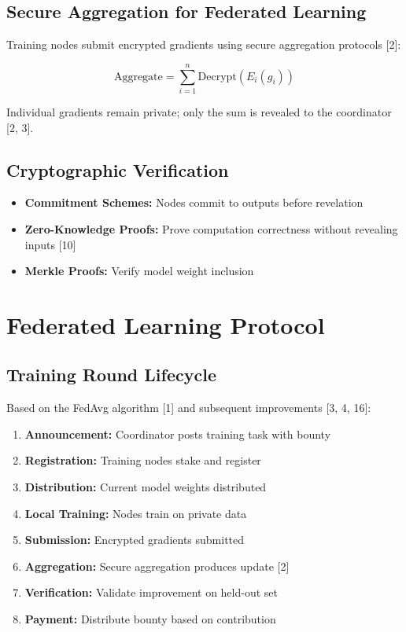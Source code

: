 \documentclass[11pt,a4paper]{article}
\begin{document}
\subsection{Secure Aggregation for Federated Learning}

Training nodes submit encrypted gradients using secure aggregation protocols [2]:

\begin{equation}
\text{Aggregate} = \sum_{i=1}^{n} \text{Decrypt}(E_i(g_i))
\end{equation}

Individual gradients remain private; only the sum is revealed to the coordinator [2, 3].

\subsection{Cryptographic Verification}

\begin{itemize}
    \item \textbf{Commitment Schemes:} Nodes commit to outputs before revelation
    \item \textbf{Zero-Knowledge Proofs:} Prove computation correctness without revealing inputs [10]
    \item \textbf{Merkle Proofs:} Verify model weight inclusion
\end{itemize}

\section{Federated Learning Protocol}

\subsection{Training Round Lifecycle}

Based on the FedAvg algorithm [1] and subsequent improvements [3, 4, 16]:

\begin{enumerate}
    \item \textbf{Announcement:} Coordinator posts training task with bounty
    \item \textbf{Registration:} Training nodes stake and register
    \item \textbf{Distribution:} Current model weights distributed
    \item \textbf{Local Training:} Nodes train on private data
    \item \textbf{Submission:} Encrypted gradients submitted
    \item \textbf{Aggregation:} Secure aggregation produces update [2]
    \item \textbf{Verification:} Validate improvement on held-out set
    \item \textbf{Payment:} Distribute bounty based on contribution
\end{enumerate}
\end{document}
